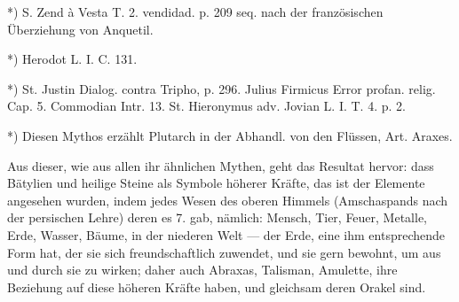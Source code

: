 \documentclass[a4paper, 11pt, oneside, polutonikogreek, german]{article}
\begin{document}
*) S. Zend à Vesta T. 2. vendidad. p. 209 seq. nach der französischen Überziehung von Anquetil.

*) Herodot L. I. C. 131.

*) St. Justin Dialog. contra Tripho, p. 296. Julius Firmicus Error profan. relig. Cap. 5. Commodian Intr. 13. St. Hieronymus adv. Jovian L. I. T. 4. p. 2.

*) Diesen Mythos erzählt Plutarch in der Abhandl. von den Flüssen, Art. Araxes.

Aus dieser, wie aus allen ihr ähnlichen Mythen, geht das Resultat hervor: dass Bätylien und heilige Steine als Symbole höherer Kräfte, das ist der Elemente angesehen wurden, indem jedes Wesen des oberen Himmels (Amschaspands nach der persischen Lehre) deren es 7. gab, nämlich: Mensch, Tier, Feuer, Metalle, Erde, Wasser, Bäume, in der niederen Welt --- der Erde, eine ihm entsprechende Form hat, der sie sich freundschaftlich zuwendet, und sie gern bewohnt, um aus und durch sie zu wirken; daher auch Abraxas, Talisman, Amulette, ihre Beziehung auf diese höheren Kräfte haben, und gleichsam deren Orakel sind.
\end{document}
